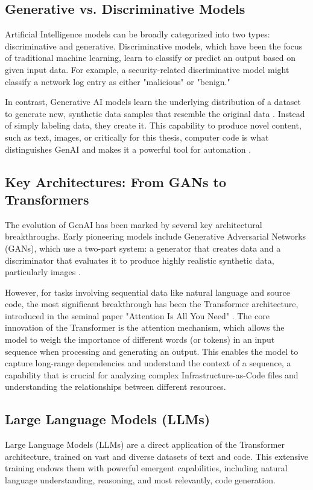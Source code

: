 \subsection{Generative vs. Discriminative Models}
Artificial Intelligence models can be broadly categorized into two types: discriminative and generative. Discriminative models, which have been the focus of traditional machine learning, learn to classify or predict an output based on given input data. For example, a security-related discriminative model might classify a network log entry as either "malicious" or "benign."

In contrast, Generative AI models learn the underlying distribution of a dataset to generate new, synthetic data samples that resemble the original data \cite{kaswan_generative_2023}. Instead of simply labeling data, they create it. This capability to produce novel content, such as text, images, or critically for this thesis, computer code is what distinguishes GenAI and makes it a powerful tool for automation \cite{gatla_advancements_2024}.

\subsection{Key Architectures: From GANs to Transformers}
The evolution of GenAI has been marked by several key architectural breakthroughs. Early pioneering models include Generative Adversarial Networks (GANs), which use a two-part system: a generator that creates data and a discriminator that evaluates it to produce highly realistic synthetic data, particularly images \cite{goodfellow_generative_2014}.

However, for tasks involving sequential data like natural language and source code, the most significant breakthrough has been the Transformer architecture, introduced in the seminal paper "Attention Is All You Need" \cite{vaswani_attention_2023}. The core innovation of the Transformer is the attention mechanism, which allows the model to weigh the importance of different words (or tokens) in an input sequence when processing and generating an output. This enables the model to capture long-range dependencies and understand the context of a sequence, a capability that is crucial for analyzing complex Infrastructure-as-Code files and understanding the relationships between different resources.

\subsection{Large Language Models (LLMs)}
Large Language Models (LLMs) are a direct application of the Transformer architecture, trained on vast and diverse datasets of text and code. This extensive training endows them with powerful emergent capabilities, including natural language understanding, reasoning, and most relevantly, code generation.


